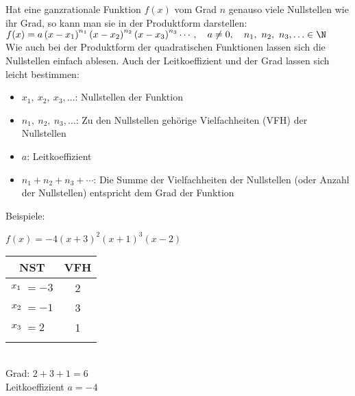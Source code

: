 Hat eine ganzrationale Funktion \(f(x)\) vom Grad \(n\) genauso viele Nullstellen wie ihr Grad, so kann man sie in der Produktform darstellen:\\
\(f(x)=a\left(x-x_1 \right)^{n_1} \left(x-x_2 \right)^{n_2}\left(x-x_3 \right)^{n_3} \cdots, \quad a\neq 0, \quad n_1,\ n_2,\ n_3,\ldots\in\N\)\\
Wie auch bei der Produktform der quadratischen Funktionen lassen sich die Nullstellen einfach ablesen. Auch der Leitkoeffizient und der Grad lassen sich leicht bestimmen:
\begin{itemize}\large
	\item[\textcolor{loes}{\textbullet}] \textcolor{loes}{\(x_1,\ x_2,\ x_3,\ldots\): Nullstellen der Funktion}
	\item[\textcolor{loes}{\textbullet}]  \textcolor{loes}{\(n_1,\ n_2,\ n_3,\ldots\): Zu den Nullstellen gehörige Vielfachheiten (VFH) der Nullstellen}
	\item[\textcolor{loes}{\textbullet}]  \textcolor{loes}{\(a\): Leitkoeffizient}
	\item[\textcolor{loes}{\textbullet}]  \textcolor{loes}{\(n_1+n_2+n_3+\cdots\): Die Summe der Vielfachheiten der Nullstellen (oder Anzahl der Nullstellen) entspricht dem Grad der Funktion}
\end{itemize}\vspace{2cm}
Beispiele:\vspace{0.3cm}\\
\begin{minipage}{0.47\textwidth}\raggedright
	\(f(x)=-4\left(x+3\right)^2\left(x+1\right)^3\left(x-2\right)\)\\ \vspace{0.3cm}
	\begin{minipage}{0.8\linewidth}
		\begin{tabular}{rlc}
			\multicolumn{2}{c}{NST}&VFH\\
			\midrule
			\(x_1\hspace{-0.3cm}\)&\(=-3\)&2\\
			\(x_2\hspace{-0.3cm}\)&\(=-1\)&3\\
			\(x_3\hspace{-0.3cm}\)&\(=2\)&1\\
			\phantom{\(x_3\)}&\phantom{\(=2\)}&\phantom{1}
		\end{tabular}
	\end{minipage}\\
	Grad: \(2+3+1=6\)\\
	Leitkoeffizient \(a=-4\)\\
\end{minipage}
